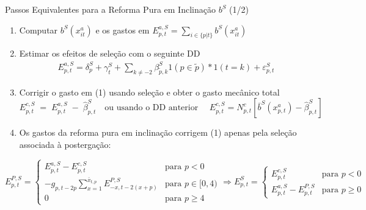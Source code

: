 \begin{frame}{Passos Equivalentes para a Reforma Pura em Inclinação $b^{S}$ (1/2)}
\begin{enumerate}
    \item Computar ${b}^S(x^a_{it})$ e {os gastos em $E^{a,S}_{p,t} = \sum_{i \in \{p|t\}} b^S(x^a_{it})$}
    \item Estimar os efeitos de seleção com o seguinte DD
    \begin{align*}
        {E^{a,S}_{p,t}}=\delta_{p}^{S}+\gamma_t^{S} +\sum_{k\neq -2}\beta_{\tilde p,k}^{S} 1(p\in \tilde p)*1(t=k)+\varepsilon_{p,t}^{S}
    \end{align*}
    
    \item Corrigir o gasto em (1) usando seleção e obter o gasto mecânico total
    \[
    {
    E^{c,S}_{p,t}
    \;=\;
    E^{a,S}_{p,t}
    \;-\;
    \hat \beta^{S}_{p,t}
    \quad
    \text{ou usando o DD anterior }
    \quad
    E^{c,S}_{p,t}
    =
    N^{c}_{p,t}[\bar b^{S}(x_{p,t}^a)-\hat \beta^S_{p,t}]
    }
    \]
    
    \item Os gastos da reforma pura em inclinação corrigem (1) apenas pela seleção associada à postergação:
\end{enumerate}
{\tiny
    \[
    E^{P,S}_{p,t}
    =
    \begin{cases}
        E^{a,S}_{p,t}-E^{c,S}_{p,t} & \text{para } p<0 \\
        -g_{p,t-2p}
            \sum_{x=1}^{\bar x_{t,p}}
            {E^{P,S}_{-x,t-2(x+p)}} & \text{para } p\in [0,4) \\
        0 & \text{para } p\geq 4
    \end{cases} \Rightarrow
    E^{S}_{p,t}
    =
    \begin{cases}
        E^{c,S}_{p,t} & \text{para } p<0 \\
        E^{a,S}_{p,t}-E^{P,S}_{p,t} & \text{para } p\geq 0
    \end{cases}
    \]}
\end{frame}

